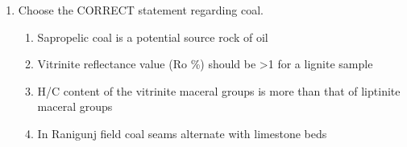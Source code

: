 \documentclass[journal,12pt,onecolumn]{IEEEtran}
\theoremstyle{remark}
\begin{document}
\begin{enumerate}
\begin{multicols}{2}
\columnbreak

\textbf{Group II}  
\begin{flushleft}
1. Triple point junction\\
2. Banding and crustification in open spaces\\
3. Protuberances of replacing mineral with replaced host\\
4. Spindles or lamellae of one mineral in another\\
5. Aggregates of minerals with non-penetrative mineral boundaries
\end{flushleft}
\end{multicols}

\begin{multicols}{2}
\begin{enumerate}
\item P--5; Q--4; R--3; S--2  
\item P--4; Q--5; R--3; S--1  
\item P--5; Q--4; R--2; S--3  
\item P--4; Q--3; R--2; S--5  
\end{enumerate}
\end{multicols}

\item Choose the CORRECT statement regarding coal.  
\begin{enumerate}
\item Sapropelic coal is a potential source rock of oil  
\item Vitrinite reflectance value (Ro \%) should be >1 for a lignite sample  
\item H/C content of the vitrinite maceral groups is more than that of liptinite maceral groups  
\item In Ranigunj field coal seams alternate with limestone beds  
\end{enumerate}

\end{enumerate}
\end{document}
